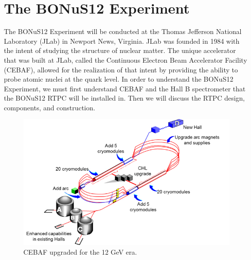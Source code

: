 \chapter{The BONuS12 Experiment}
\label{ch:bonus}
The BONuS12 Experiment will be conducted at the Thomas Jefferson National Laboratory (JLab) in Newport News, Virginia. JLab was founded in 1984 with the intent of studying the structure of nuclear matter. The unique accelerator that was built at JLab, called the Continuous Electron Beam Accelerator Facility (CEBAF), allowed for the realization of that intent by providing the ability to probe atomic nuclei at the quark level. In order to understand the BONuS12 Experiment, we must first understand CEBAF and the Hall B spectrometer that the BONuS12 RTPC will be installed in. Then we will discuss the RTPC design, components, and construction.

\begin{figure}[h!]
	\centering
	\includegraphics[width=0.8\linewidth]{figures/cebaf.png}
	\caption{CEBAF upgraded for the 12 GeV era.}
	\label{fig:cebaf}
\end{figure}

